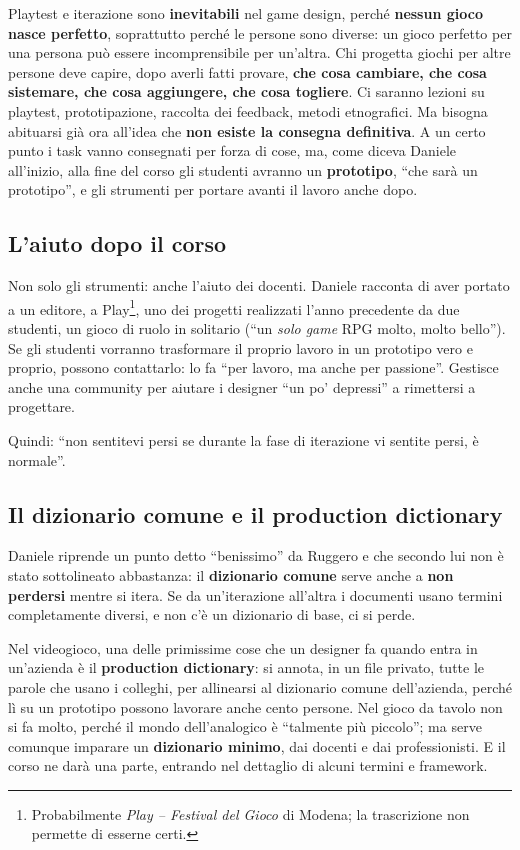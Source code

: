 Playtest e iterazione sono \textbf{inevitabili} nel game design, perché
\textbf{nessun gioco nasce perfetto}, soprattutto perché le persone sono
diverse: un gioco perfetto per una persona può essere incomprensibile per
un'altra. Chi progetta giochi per altre persone deve capire, dopo averli fatti
provare, \textbf{che cosa cambiare, che cosa sistemare, che cosa aggiungere, che
cosa togliere}. Ci saranno lezioni su playtest, prototipazione, raccolta dei
feedback, metodi etnografici. Ma bisogna abituarsi già ora all'idea che
\textbf{non esiste la consegna definitiva}. A un certo punto i task vanno
consegnati per forza di cose, ma, come diceva Daniele all'inizio, alla fine del
corso gli studenti avranno un \textbf{prototipo}, ``che sarà un prototipo'', e
gli strumenti per portare avanti il lavoro anche dopo.

\subsection{L'aiuto dopo il corso}

Non solo gli strumenti: anche l'aiuto dei docenti. Daniele racconta di aver
portato a un editore, a Play\footnote{Probabilmente \emph{Play -- Festival del
Gioco} di Modena; la trascrizione non permette di esserne certi.}, uno dei
progetti realizzati l'anno precedente da due studenti, un gioco di ruolo in
solitario (``un \emph{solo game} RPG molto, molto bello''). Se gli studenti
vorranno trasformare il proprio lavoro in un prototipo vero e proprio, possono
contattarlo: lo fa ``per lavoro, ma anche per passione''. Gestisce anche una
community per aiutare i designer ``un po' depressi'' a rimettersi a progettare.

Quindi: ``non sentitevi persi se durante la fase di iterazione vi sentite
persi, è normale''.

\subsection{Il dizionario comune e il production dictionary}

Daniele riprende un punto detto ``benissimo'' da Ruggero e che secondo lui non è
stato sottolineato abbastanza: il \textbf{dizionario comune} serve anche a
\textbf{non perdersi} mentre si itera. Se da un'iterazione all'altra i
documenti usano termini completamente diversi, e non c'è un dizionario di base,
ci si perde.

Nel videogioco, una delle primissime cose che un designer fa quando entra in
un'azienda è il \textbf{production dictionary}: si annota, in un file privato,
tutte le parole che usano i colleghi, per allinearsi al dizionario comune
dell'azienda, perché lì su un prototipo possono lavorare anche cento persone.
Nel gioco da tavolo non si fa molto, perché il mondo dell'analogico è
``talmente più piccolo''; ma serve comunque imparare un \textbf{dizionario
minimo}, dai docenti e dai professionisti. E il corso ne darà una parte,
entrando nel dettaglio di alcuni termini e framework.

